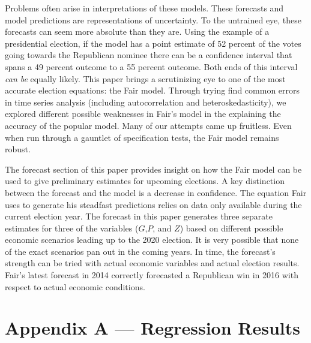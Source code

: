 \documentclass[11,]{article}
\begin{document}
Problems often arise in interpretations of these models. These forecasts
and model predictions are representations of uncertainty. To the
untrained eye, these forecasts can seem more absolute than they are.
Using the example of a presidential election, if the model has a point
estimate of 52 percent of the votes going towards the Republican nominee
there can be a confidence interval that spans a 49 percent outcome to a
55 percent outcome. Both ends of this interval \emph{can be} equally
likely. This paper brings a scrutinizing eye to one of the most accurate
election equations: the Fair model. Through trying find common errors in
time series analysis (including autocorrelation and heteroskedasticity),
we explored different possible weaknesses in Fair's model in the
explaining the accuracy of the popular model. Many of our attempts came
up fruitless. Even when run through a gauntlet of specification tests,
the Fair model remains robust.

The forecast section of this paper provides insight on how the Fair
model can be used to give preliminary estimates for upcoming elections.
A key distinction between the forecast and the model is a decrease in
confidence. The equation Fair uses to generate his steadfast predictions
relies on data only available during the current election year. The
forecast in this paper generates three separate estimates for three of
the variables (\(G\),\(P\), and \(Z\)) based on different possible
economic scenarios leading up to the 2020 election. It is very possible
that none of the exact scenarios pan out in the coming years. In time,
the forecast's strength can be tried with actual economic variables and
actual election results. Fair's latest forecast in 2014 correctly
forecasted a Republican win in 2016 with respect to actual economic
conditions.

\clearpage

\hypertarget{appendix-a-regression-results}{%
\section{Appendix A --- Regression
Results}\label{appendix-a-regression-results}}
\end{document}

